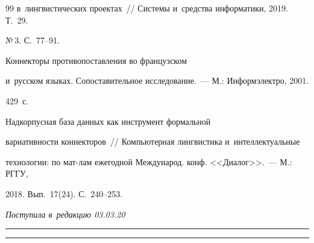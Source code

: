 {{\begin{thebibliography}{99}
в~лингвистических проектах~/\!\!/ Системы и~средства информатики, 2019. Т.~29. 


№\,3. С.~77--91.







 Коннекторы противопоставления во французском 


и~русском языках. Сопоставительное исследование.~--- М.: Информэлектро, 2001. 


429~с. 




 Надкорпусная база данных как инструмент формальной 


вариативности коннекторов~/\!\!/ Компьютерная лингвистика и~интеллектуальные 


технологии: по мат-лам ежегодной Международ. конф. <<Диалог>>.~--- М.: РГГУ, 


2018. Вып.~17(24). С.~240--253.





 \end{thebibliography}


} }





\vspace*{-3pt}





\hfill{\small\textit{Поступила в~редакцию 03.03.20}}





\vspace*{8pt}





\hrule





\vspace*{2pt}















\hrule





